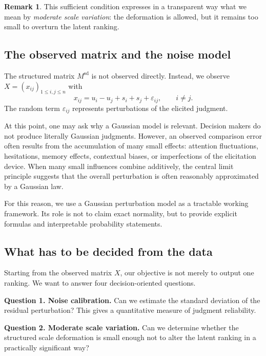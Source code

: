 \documentclass[11pt]{amsart}
\theoremstyle{definition}
\newtheorem{remark}[definition]{Remark}
\theoremstyle{plain}
\numberwithin{equation}{section}
\begin{document}
\begin{remark}
This sufficient condition expresses in a transparent way what we mean by \emph{moderate scale variation}: the deformation is allowed, but it remains too small to overturn the latent ranking.
\end{remark}

\subsection{The observed matrix and the noise model}

The structured matrix $M^{\mathrm{sd}}$ is not observed directly. Instead, we observe
\(
X=(x_{ij})_{1\le i,j\le n}
\)
with
\begin{equation}\label{eq:observedmodel}
x_{ij}=u_i-u_j+s_i+s_j+\varepsilon_{ij},
\qquad i\neq j.
\end{equation}
The random term $\varepsilon_{ij}$ represents perturbations of the elicited judgment.

At this point, one may ask why a Gaussian model is relevant. Decision makers do not produce literally Gaussian judgments. However, an observed comparison error often results from the accumulation of many small effects: attention fluctuations, hesitations, memory effects, contextual biases, or imperfections of the elicitation device. When many small influences combine additively, the central limit principle suggests that the overall perturbation is often reasonably approximated by a Gaussian law.

For this reason, we use a Gaussian perturbation model as a tractable working framework. Its role is not to claim exact normality, but to provide explicit formulas and interpretable probability statements.

\subsection{What has to be decided from the data}

Starting from the observed matrix $X$, our objective is not merely to output one ranking. We want to answer four decision-oriented questions.

\medskip

\noindent\textbf{Question 1. Noise calibration.}
Can we estimate the standard deviation of the residual perturbation? This gives a quantitative measure of judgment reliability.

\medskip

\noindent\textbf{Question 2. Moderate scale variation.}
Can we determine whether the structured scale deformation is small enough not to alter the latent ranking in a practically significant way?
\end{document}
